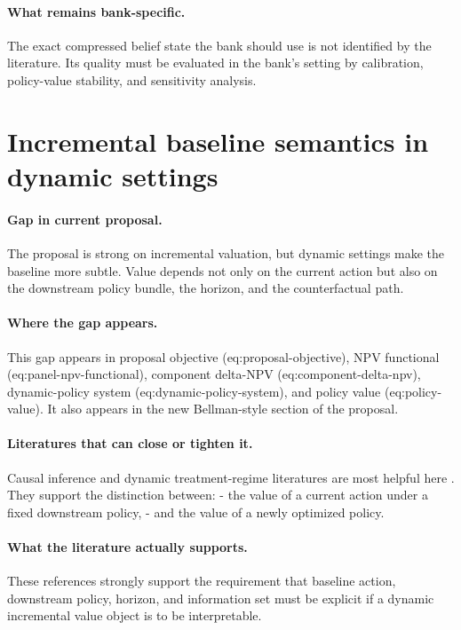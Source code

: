 \documentclass[11pt]{article}
\begin{document}
\paragraph{What remains bank-specific.}
The exact compressed belief state the bank should use is not identified by the
literature. Its quality must be evaluated in the bank's setting by calibration,
policy-value stability, and sensitivity analysis.

\section{Incremental baseline semantics in dynamic settings}

\paragraph{Gap in current proposal.}
The proposal is strong on incremental valuation, but dynamic settings make the
baseline more subtle. Value depends not only on the current action but also on
the downstream policy bundle, the horizon, and the counterfactual path.

\paragraph{Where the gap appears.}
This gap appears in proposal objective (eq:proposal-objective),
NPV functional (eq:panel-npv-functional), component delta-NPV
(eq:component-delta-npv), dynamic-policy system (eq:dynamic-policy-system), and
policy value (eq:policy-value). It also appears in the new Bellman-style section
of the proposal.

\paragraph{Literatures that can close or tighten it.}
Causal inference and dynamic treatment-regime literatures are most helpful here
\citep{murphy2003dynamic,imbensrubin2015causal,hernanrobins2020causal,
puterman1994mdp}. They support the distinction between:
- the value of a current action under a fixed downstream policy,
- and the value of a newly optimized policy.

\paragraph{What the literature actually supports.}
These references strongly support the requirement that baseline action,
downstream policy, horizon, and information set must be explicit if a dynamic
incremental value object is to be interpretable.
\end{document}
